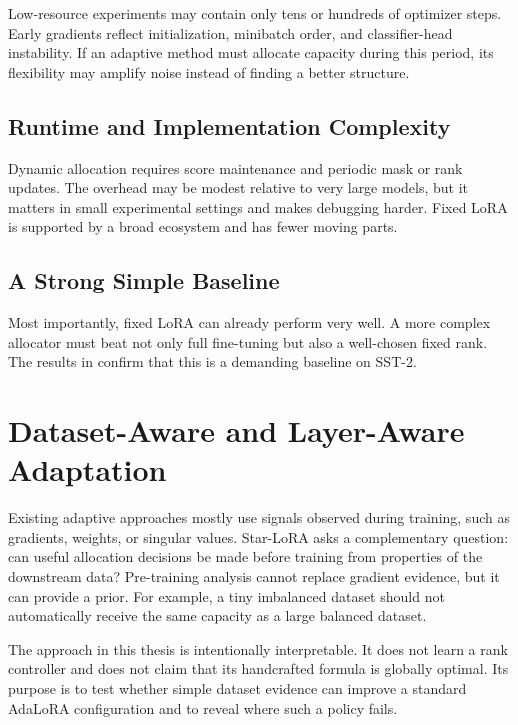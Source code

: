 Low-resource experiments may contain only tens or hundreds of optimizer steps. Early gradients
reflect initialization, minibatch order, and classifier-head instability. If an adaptive method
must allocate capacity during this period, its flexibility may amplify noise instead of finding a
better structure.

\subsection{Runtime and Implementation Complexity}

Dynamic allocation requires score maintenance and periodic mask or rank updates. The overhead may
be modest relative to very large models, but it matters in small experimental settings and makes
debugging harder. Fixed LoRA is supported by a broad ecosystem and has fewer moving parts.

\subsection{A Strong Simple Baseline}

Most importantly, fixed LoRA can already perform very well. A more complex allocator must beat not
only full fine-tuning but also a well-chosen fixed rank. The results in  confirm
that this is a demanding baseline on SST-2.

\section{Dataset-Aware and Layer-Aware Adaptation}

Existing adaptive approaches mostly use signals observed during training, such as gradients,
weights, or singular values. Star-LoRA asks a complementary question: can useful allocation
decisions be made before training from properties of the downstream data? Pre-training analysis
cannot replace gradient evidence, but it can provide a prior. For example, a tiny imbalanced
dataset should not automatically receive the same capacity as a large balanced dataset.

The approach in this thesis is intentionally interpretable. It does not learn a rank controller
and does not claim that its handcrafted formula is globally optimal. Its purpose is to test whether
simple dataset evidence can improve a standard AdaLoRA configuration and to reveal where such a
policy fails.
